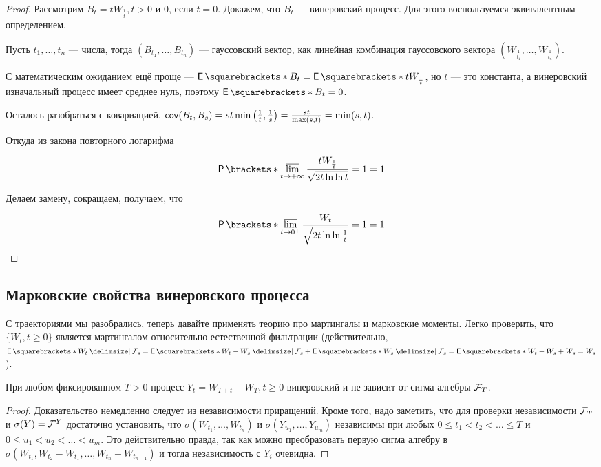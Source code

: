 \begin{proof}
  Рассмотрим $B_t = tW_{\frac1t}, t > 0$ и 0, если $t = 0$. 
  Докажем, что $B_t$ --- винеровский процесс.
  Для этого воспользуемся эквивалентным определением.

  Пусть $t_1, \ldots, t_n$ --- числа, тогда $(B_{t_1}, \ldots, B_{t_n})$ --- гауссовский
  вектор, как линейная комбинация гауссовского вектора $(W_{\frac{1}{t_1}},\ldots,
  W_{\frac{1}{t_n}})$.

  С математическим ожиданием ещё проще --- $\E{B_t} = \E{tW_{\frac1t}}$, но $t$
  --- это константа, а винеровский изначальный процесс имеет среднее нуль, поэтому
  $\E{B_t} = 0$.

  Осталось разобраться с ковариацией. $\operatorname{\mathsf{cov}}(B_t, B_s) = st\min\left(\frac{1}{t},
  \frac{1}{s}\right) = \frac{st}{\max(s, t)} = \min(s, t)$.

  Откуда из закона повторного логарифма

  \[
    \Pr{\varlimsup\limits_{t \to +\infty} \frac{tW_{\frac{1}{t}}}{\sqrt{2t\ln\ln t}} = 1} = 1
  \]

  Делаем замену, сокращаем, получаем, что

  \[
    \Pr{\varlimsup\limits_{t \to 0^+} \frac{W_{t}}{\sqrt{2t\ln\ln \frac1t}} = 1} = 1
  \]
\end{proof}

\subsection{Марковские свойства винеровского процесса}

С траекториями мы разобрались, теперь давайте применять теорию про мартингалы
и марковские моменты. Легко проверить, что 
$\{W_t, t \geq 0\}$ является мартингалом относительно естественной
фильтрации (действительно, 
$\E{W_t \given \F_s} = \E{W_t - W_s \given \F_s} + \E{W_s \given \F_s} = 
\E{W_t - W_s} + W_s = W_s$).

\begin{theorem}
  При любом фиксированном $T > 0$ процесс $Y_t = W_{T + t} - W_T, t \geq 0$
  винеровский и не зависит от сигма алгебры $\mathcal{F}_T$.
\end{theorem}

\begin{proof}
  Доказательство немедленно следует из независимости приращений. Кроме того,
  надо заметить, что для проверки независимости $\mathcal{F}_T$ и $\sigma(Y) = \mathcal{F}^Y$ 
  достаточно установить, что $\sigma(W_{t_1}, \ldots, W_{t_n})$ и 
  $\sigma(Y_{u_1}, \ldots, Y_{u_m})$ независимы при любых
  $0 \leq t_1 < t_2 < \ldots \leq T$ и $0 \leq u_1 < u_2 < \ldots < u_m$. Это
  действительно правда, так как можно преобразовать первую сигма алгебру в
  $\sigma(W_{t_1}, W_{t_2} - W_{t_1}, \ldots, W_{t_n} - W_{t_{n - 1}})$ и тогда
  независимость с $Y_i$ очевидна.
\end{proof}

